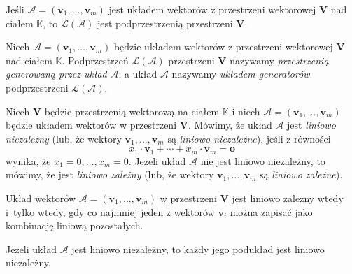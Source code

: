 	\begin{tw}
	 Jeśli  $\mathcal{A} =(\textbf{v}_1, \ldots, \textbf{v}_m)$ jest układem wektorów z przestrzeni wektorowej $\textbf{V}$ nad ciałem $\mathbb{K}$, to $\mathcal{L}(\mathcal{A})$ jest podprzestrzenią przestrzeni \textbf{V}.
 	\end{tw}

 	\begin{df}
 	Niech  $\mathcal{A} =(\textbf{v}_1, \ldots, \textbf{v}_m)$ będzie układem wektorów z przestrzeni wektorowej $\textbf{V}$ nad ciałem $\mathbb{K}$. Podprzestrzeń $\mathcal{L}(\mathcal{A})$ przestrzeni \textbf{V} nazywamy \textit{przestrzenią generowaną przez układ} $\mathcal{A}$, a układ $\mathcal{A}$ nazywamy \textit{układem generatorów} podprzestrzeni $\mathcal{L}(\mathcal{A})$.
 	\end{df}
 	
 	\begin{df}
 		Niech \textbf{V} będzie przestrzenią wektorową na ciałem $\mathbb{K}$ i niech $\mathcal{A} =(\textbf{v}_1, \ldots, \textbf{v}_m)$ będzie układem wektorów w przestrzeni \textbf{V}. Mówimy, że układ $\mathcal{A}$ jest \textit{liniowo niezależny} (lub, że wektory $\textbf{v}_1, \ldots, \textbf{v}_m$ są \textit{liniowo niezależne}), jeśli z równości
 		\begin{equation*}
	 			x_1 \cdot \textbf{v}_1 + \cdots + x_m \cdot \textbf{v}_m = \textbf{o}
 		\end{equation*}
 		wynika, że $x_1 = 0, \ldots, x_m = 0$. Jeżeli układ $\mathcal{A}$ nie jest liniowo niezależny, to mówimy, że jest \textit{liniowo zależny} (lub, że wektory $\textbf{v}_1, \ldots, \textbf{v}_m$ są \textit{liniowo zależne}).
 	\end{df}
 	
 	\begin{uwg}
 		Układ wektorów $\mathcal{A} =(\textbf{v}_1, \ldots, \textbf{v}_m)$ w przestrzeni \textbf{V} jest liniowo zależny wtedy i~tylko wtedy, gdy co najmniej jeden z wektorów $\textbf{v}_i$ można zapisać jako kombinację liniową pozostałych.
 	\end{uwg}
 	
 	\begin{uwg}
 		Jeżeli układ $\mathcal{A}$ jest liniowo niezależny, to każdy jego podukład jest liniowo niezależny.
 	\end{uwg}
 	
